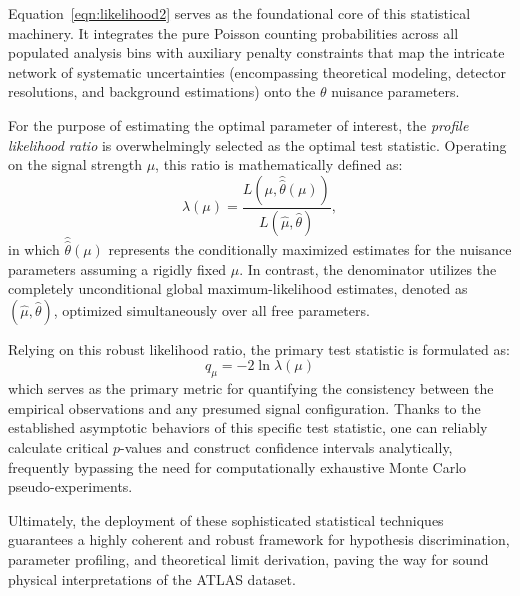 Equation~\eqref{eqn:likelihood2} serves as the foundational core of this statistical machinery. It integrates the pure Poisson counting probabilities across all populated analysis bins with auxiliary penalty constraints that map the intricate network of systematic uncertainties (encompassing theoretical modeling, detector resolutions, and background estimations) onto the $\theta$ nuisance parameters.

For the purpose of estimating the optimal parameter of interest, the \textit{profile likelihood ratio} is overwhelmingly selected as the optimal test statistic. Operating on the signal strength $\mu$, this ratio is mathematically defined as:
\[
\lambda(\mu) =
\frac{L(\mu, \hat{\hat{\theta}}(\mu))}
     {L(\hat{\mu}, \hat{\theta})},
\]
in which $\hat{\hat{\theta}}(\mu)$ represents the conditionally maximized estimates for the nuisance parameters assuming a rigidly fixed $\mu$. In contrast, the denominator utilizes the completely unconditional global maximum-likelihood estimates, denoted as $(\hat{\mu}, \hat{\theta})$, optimized simultaneously over all free parameters.

Relying on this robust likelihood ratio, the primary test statistic is formulated as:
\[
q_\mu = -2 \ln \lambda(\mu)
\]
which serves as the primary metric for quantifying the consistency between the empirical observations and any presumed signal configuration. Thanks to the established asymptotic behaviors of this specific test statistic, one can reliably calculate critical $p$-values and construct confidence intervals analytically, frequently bypassing the need for computationally exhaustive Monte Carlo pseudo-experiments.

Ultimately, the deployment of these sophisticated statistical techniques guarantees a highly coherent and robust framework for hypothesis discrimination, parameter profiling, and theoretical limit derivation, paving the way for sound physical interpretations of the ATLAS dataset.